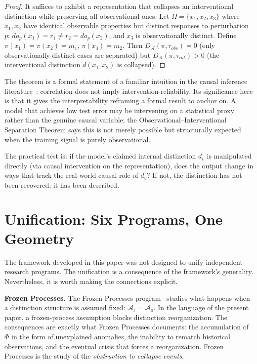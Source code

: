 \documentclass[11pt, a4paper]{article}
\theoremstyle{plain}
\theoremstyle{definition}
\theoremstyle{remark}
\newcommand{\Adm}{\mathcal{A}}
\newcommand{\Proj}{\pi}
\newcommand{\PhiF}{\varPhi}
\newcommand{\dA}{D_{\!\mathcal{A}}}
\begin{document}
\begin{proof}
It suffices to exhibit a representation that collapses an interventional
distinction while preserving all observational ones. Let
$\Omega = \{x_1, x_2, x_3\}$ where $x_1, x_2$ have identical
observable properties but distinct responses to perturbation $p$:
$do_p(x_1) = r_1 \neq r_2 = do_p(x_2)$, and $x_3$ is observationally
distinct. Define $\Proj(x_1) = \Proj(x_2) = m_1$, $\Proj(x_3) = m_2$.
Then $\dA(\Proj, \tau_{obs}) = 0$ (only observationally distinct cases
are separated) but $\dA(\Proj, \tau_{int}) > 0$ (the interventional
distinction $d(x_1, x_2)$ is collapsed).
\end{proof}

The theorem is a formal statement of a familiar intuition in the
causal inference literature~\cite{pearl2009}: correlation does not
imply intervention-reliability. Its significance here is that it
gives the interpretability reframing a formal result to anchor on.
A model that achieves low test error may be intervening on a
statistical proxy rather than the genuine causal variable; the
Observational--Interventional Separation Theorem says this is
not merely possible but structurally expected when the training
signal is purely observational.

The practical test is: if the model's claimed internal distinction
$d_v$ is manipulated directly (via causal intervention on the
representation), does the output change in ways that track
the real-world causal role of $d_v$? If not, the distinction has
not been recovered; it has been described.

\section{Unification: Six Programs, One Geometry}
\label{sec:unification}

The framework developed in this paper was not designed to unify
independent research programs. The unification is a consequence
of the framework's generality. Nevertheless, it is worth making
the connections explicit.

\medskip
\noindent\textbf{Frozen Processes.}
The Frozen Processes program~\cite{flyxion2026b} studies what happens
when a distinction structure is assumed fixed: $\Adm_t = \Adm_0$.
In the language of the present paper, a frozen-process assumption
blocks distinction reorganization. The consequences are exactly what
Frozen Processes documents: the accumulation of $\PhiF$ in the form
of unexplained anomalies, the inability to rematch historical
observations, and the eventual crisis that forces a reorganization.
Frozen Processes is the study of the \emph{obstruction to collapse events}.
\end{document}
